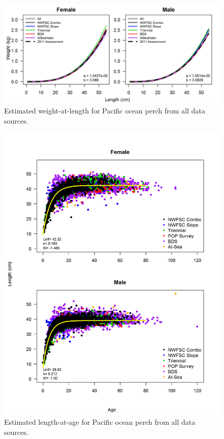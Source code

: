 \documentclass[12pt,]{article}
\begin{document}
\FloatBarrier 

\begin{figure}
\centering
\includegraphics{Figures/weightAtLengthPred.png}
\caption{Estimated weight-at-length for Pacific ocean perch from all
data sources. \label{fig:Wt_len_pred}}
\end{figure}

\FloatBarrier 

\begin{figure}
\centering
\includegraphics{Figures/LengthAgeAll.png}
\caption{Estimated length-at-age for Pacific ocean perch from all data
sources. \label{fig:Len_Age}}
\end{figure}
\end{document}
